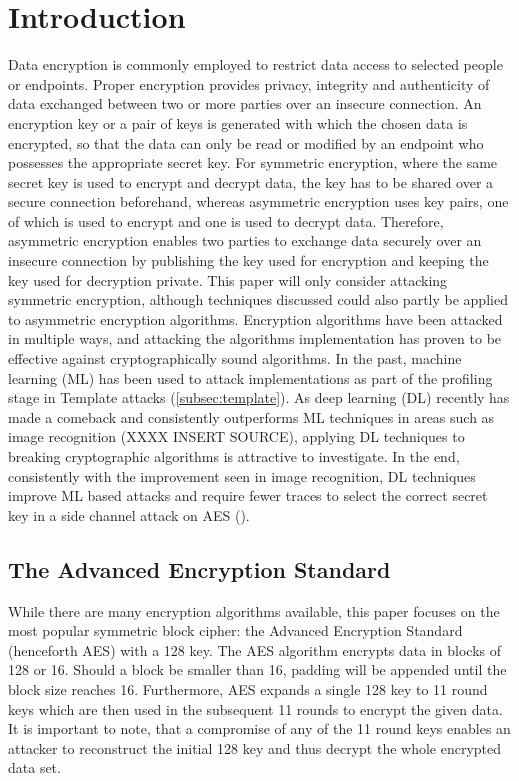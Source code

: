 \documentclass[journal]{IEEEtran}
\begin{document}
\section{Introduction}
Data encryption is commonly employed to restrict data access to selected people or endpoints. Proper encryption provides privacy, integrity and authenticity of data exchanged between two or more parties over an insecure connection. An encryption key or a pair of keys is generated with which the chosen data is encrypted, so that the data can only be read or modified by an endpoint who possesses the appropriate secret key. For symmetric encryption, where the same secret key is used to encrypt and decrypt data, the key has to be shared over a secure connection beforehand, whereas asymmetric encryption uses key pairs, one of which is used to encrypt and one is used to decrypt data. Therefore, asymmetric encryption enables two parties to exchange data securely over an insecure connection by publishing the key used for encryption and keeping the key used for decryption private. This paper will only consider attacking symmetric encryption, although techniques discussed could also partly be applied to asymmetric encryption algorithms. Encryption algorithms have been attacked in multiple ways, and attacking the algorithms implementation has proven to be effective against cryptographically sound algorithms. In the past, machine learning (ML) has been used to attack implementations as part of the profiling stage in Template attacks (\autoref{subsec:template}). As deep learning (DL) recently has made a comeback and consistently outperforms ML techniques in areas such as image recognition (XXXX INSERT SOURCE), applying DL techniques to breaking cryptographic algorithms is attractive to investigate. In the end, consistently with the improvement seen in image recognition, DL techniques improve ML based attacks and require fewer traces to select the correct secret key in a side channel attack on AES ().  

\subsection{The Advanced Encryption Standard}
\label{sc:aes}
While there are many encryption algorithms available, this paper focuses on the most popular symmetric block cipher: the Advanced Encryption Standard (henceforth AES) with a \SI{128}{\bit} key. The AES algorithm encrypts data in blocks of \SI{128}{\bit} or \SI{16}{\byte}. Should a block be smaller than \SI{16}{\byte}, padding will be appended until the block size reaches \SI{16}{\byte}. Furthermore, AES expands a single \SI{128}{\bit} key to 11 round keys which are then used in the subsequent 11 rounds to encrypt the given data. It is important to note, that a compromise of any of the 11 round keys enables an attacker to reconstruct the initial \SI{128}{\bit} key and thus decrypt the whole encrypted data set. 
\end{document}
